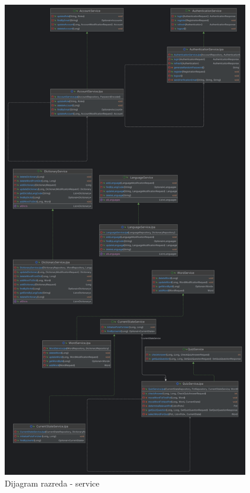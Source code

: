 			\begin{figure}[H]
				\centering
				\includegraphics[height=600pt]{slike/ClassDiagram2.PNG}
				\caption{Dijagram razreda - service}
				\label{fig:classDiagram2}
			\end{figure}
			
